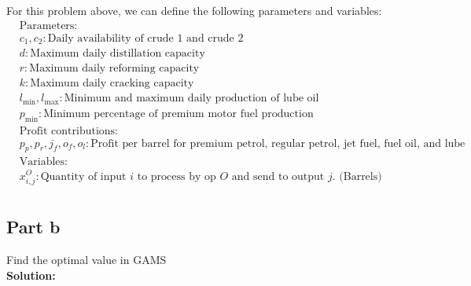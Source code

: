 \documentclass[11pt]{article}
\begin{document}
For this problem above, we can define the following parameters and variables:
\begin{align*}
& \text{Parameters:} \\
& c_1, c_2: \text{Daily availability of crude 1 and crude 2} \\
& d: \text{Maximum daily distillation capacity} \\
& r: \text{Maximum daily reforming capacity} \\
& k: \text{Maximum daily cracking capacity} \\
& l_{\min}, l_{\max}: \text{Minimum and maximum daily production of lube oil} \\
& p_{\min}: \text{Minimum percentage of premium motor fuel production} \\
& \text{Profit contributions:} \\
& p_p, p_r, j_f, o_f, o_l: \text{Profit per barrel for premium petrol, regular petrol, jet fuel, fuel oil, and lube oil} \\
& \text{Variables:} \\
& x_{i,j}^O : \text{Quantity of input $i$ to process by op $O$ and send to output $j$. (Barrels)} \\
\end{align*}

\subsection{Part b}
Find the optimal value in GAMS
\\
\textbf{Solution: }
\end{document}
